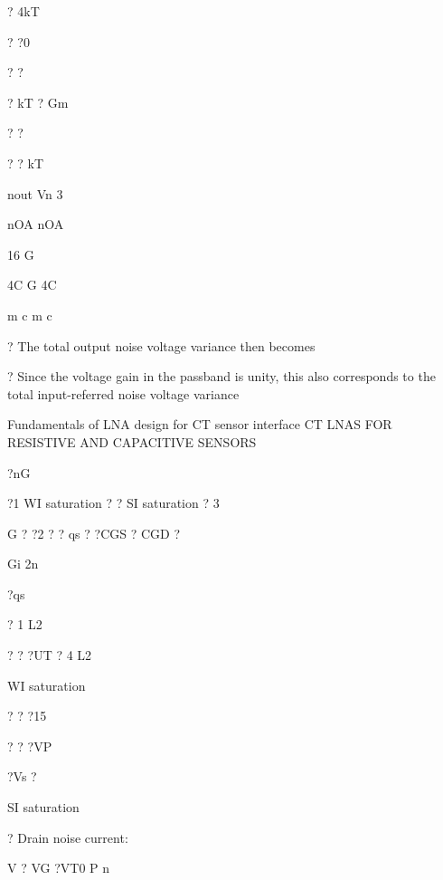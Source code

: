 \documentclass[2pt,landscape]{article}
\begin{document}
\begin{multicols*}{5}
? 4kT


? ?0


? ?  


? kT ? Gm


? ?  


? ? kT


nout Vn 3


nOA	nOA



16 G



4C	G
4C


m	c	m	c

?	The total output noise voltage variance then becomes

?	Since the voltage gain in the passband is unity, this also corresponds 
to the total input-referred noise voltage variance

























Fundamentals of LNA design for CT sensor interface
CT LNA\textbullet S FOR RESISTIVE AND 
CAPACITIVE SENSORS



?nG


?1	WI saturation
? ?
SI saturation
? 3


G	? ?2  ? ? qs  ? ?CGS  ? CGD ?

Gi	2n



?qs


?	1	L2


?	? ?UT
? 4	L2


WI saturation


?	?
?15


? ? ?VP


?Vs ?


SI saturation





?	Drain noise current:


V ? VG ?VT0
P	n









\end{multicols*}
\end{document}
